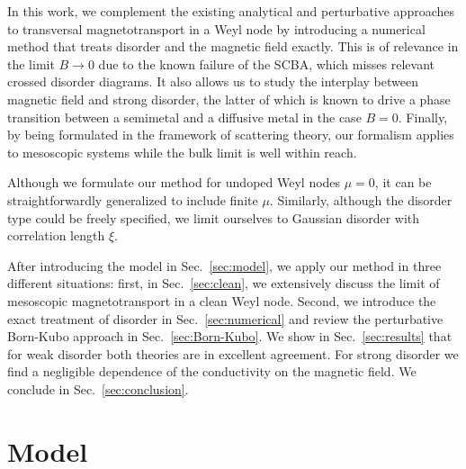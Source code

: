 \documentclass[aps,prb,10pt,amsmath,amssymb,twocolumn,floatfix,superscriptaddress,showpacs,numerical,footinbib]{revtex4-1}
\begin{document}
In this work, we complement the existing analytical and perturbative approaches to transversal magnetotransport in a Weyl node by introducing a numerical method that treats disorder and the magnetic field exactly.
%
This is of relevance in the limit $B \rightarrow 0$ due to the known failure of the SCBA, which misses relevant crossed disorder diagrams.\cite{Sbierski2014a}
%
It also allows us to study the interplay between magnetic field and strong disorder, the latter of which is known to drive a phase transition\cite{Fradkin1986,Syzranov2016c} between a semimetal and a diffusive metal in the case $B=0$.
%
Finally, by being formulated in the framework of scattering theory, our formalism applies to mesoscopic systems while the bulk limit is well within reach.

Although we formulate our method for undoped Weyl nodes $\mu=0$, it can be straightforwardly generalized to include finite $\mu$. Similarly, although the disorder type could be freely specified, we limit ourselves to Gaussian disorder with correlation length $\xi$.

After introducing the model in Sec.~\ref{sec:model}, we apply our method in three different situations:
%
first, in Sec.~\ref{sec:clean}, we extensively discuss the limit of mesoscopic magnetotransport in a clean Weyl node.
%
Second, we introduce the exact treatment of disorder in Sec.~\ref{sec:numerical} and review the perturbative Born-Kubo approach in Sec.~\ref{sec:Born-Kubo}.
%
We show in Sec.~\ref{sec:results} that for weak disorder both theories are in excellent agreement.
%
For strong disorder we find a negligible dependence of the conductivity on the magnetic field.
%
We conclude in Sec.~\ref{sec:conclusion}.

\section{Model \label{sec:model}}
\end{document}
